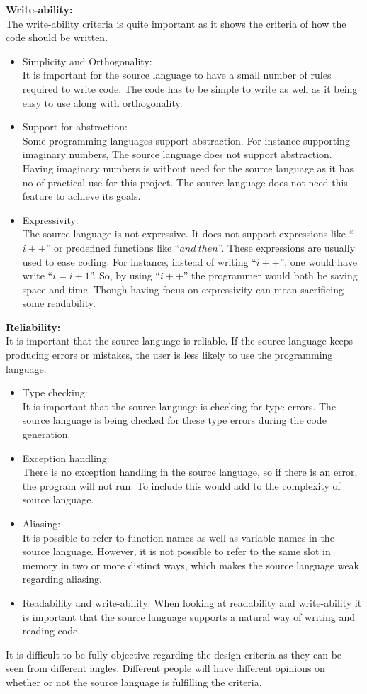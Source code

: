 \textbf{Write-ability:} \\
The write-ability criteria is quite important as it shows the criteria of how the code should be written. 
\begin{itemize}
\item Simplicity and Orthogonality: \\
It is important for the source language to have a small number of rules required to write code. The code has to be simple to write as well as it being easy to use along with orthogonality.
\item Support for abstraction: \\
Some programming languages support abstraction. For instance supporting imaginary numbers, The source language does not support abstraction. Having imaginary numbers is without need for the source language as it has no of practical use for this project. The source language does not need this feature to achieve its goals.
\item Expressivity: \\
The source language is not expressive. It does not support expressions like ``$i++$'' or predefined functions like ``$and~then$''. These expressions are usually used to ease coding. For instance, instead of writing ``$i++$'', one would have write ``$i = i + 1$''. So, by using ``$i++$'' the programmer would both be saving space and time. Though having focus on expressivity can mean sacrificing some readability. 
\end{itemize}
\textbf{Reliability:} \\
It is important that the source language is reliable. If the source language keeps producing errors or mistakes, the user is less likely to use the programming language.
\begin{itemize}
\item Type checking: \\
It is important that the source language is checking for type errors. The source language is being checked for these type errors during the code generation.
\item Exception handling: \\
There is no exception handling in the source language, so if there is an error, the program will not run. To include this would add to the complexity of source language.
\item Aliasing: \\
It is possible to refer to function-names as well as variable-names in the source language. However, it is not possible to refer to the same slot in memory in two or more distinct ways, which makes the source language weak regarding aliasing. 
\item Readability and write-ability:
When looking at readability and write-ability it is important that the source language supports a natural way of writing and reading code. 
\end{itemize}
It is difficult to be fully objective regarding the design criteria as they can be seen from different angles. Different people will have different opinions on whether or not the source language is fulfilling the criteria. 